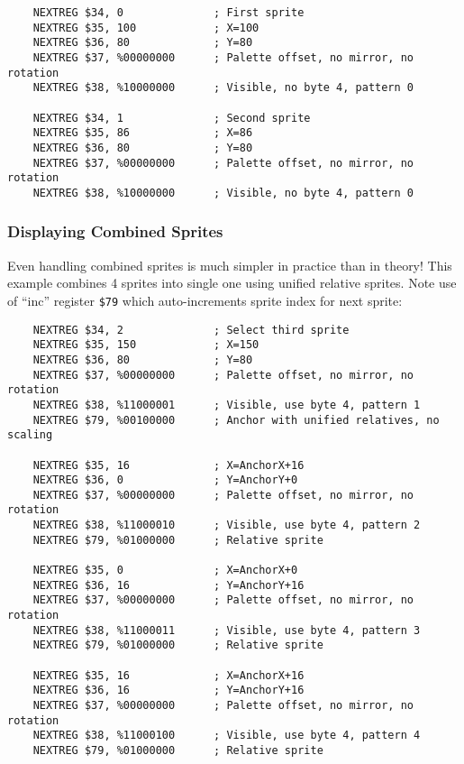 \documentclass[12pt,twoside,openright,a4paper]{book}
\begin{document}
\begin{lstlisting}
	NEXTREG $34, 0              ; First sprite
	NEXTREG $35, 100            ; X=100
	NEXTREG $36, 80             ; Y=80
	NEXTREG $37, %00000000      ; Palette offset, no mirror, no rotation
	NEXTREG $38, %10000000      ; Visible, no byte 4, pattern 0

	NEXTREG $34, 1              ; Second sprite
	NEXTREG $35, 86             ; X=86
	NEXTREG $36, 80             ; Y=80
	NEXTREG $37, %00000000      ; Palette offset, no mirror, no rotation
	NEXTREG $38, %10000000      ; Visible, no byte 4, pattern 0
\end{lstlisting}


\pagebreak
\subsubsection{Displaying Combined Sprites}

Even handling combined sprites is much simpler in practice than in theory! This example combines 4 sprites into single one using unified relative sprites. Note use of ``inc'' register {\tt \$79} which auto-increments sprite index for next sprite:

\begin{lstlisting}
	NEXTREG $34, 2              ; Select third sprite
	NEXTREG $35, 150            ; X=150
	NEXTREG $36, 80             ; Y=80
	NEXTREG $37, %00000000      ; Palette offset, no mirror, no rotation
	NEXTREG $38, %11000001      ; Visible, use byte 4, pattern 1
	NEXTREG $79, %00100000      ; Anchor with unified relatives, no scaling

	NEXTREG $35, 16             ; X=AnchorX+16
	NEXTREG $36, 0              ; Y=AnchorY+0
	NEXTREG $37, %00000000      ; Palette offset, no mirror, no rotation
	NEXTREG $38, %11000010      ; Visible, use byte 4, pattern 2
	NEXTREG $79, %01000000      ; Relative sprite

	NEXTREG $35, 0              ; X=AnchorX+0
	NEXTREG $36, 16             ; Y=AnchorY+16
	NEXTREG $37, %00000000      ; Palette offset, no mirror, no rotation
	NEXTREG $38, %11000011      ; Visible, use byte 4, pattern 3
	NEXTREG $79, %01000000      ; Relative sprite

	NEXTREG $35, 16             ; X=AnchorX+16
	NEXTREG $36, 16             ; Y=AnchorY+16
	NEXTREG $37, %00000000      ; Palette offset, no mirror, no rotation
	NEXTREG $38, %11000100      ; Visible, use byte 4, pattern 4
	NEXTREG $79, %01000000      ; Relative sprite
\end{lstlisting}
\end{document}
